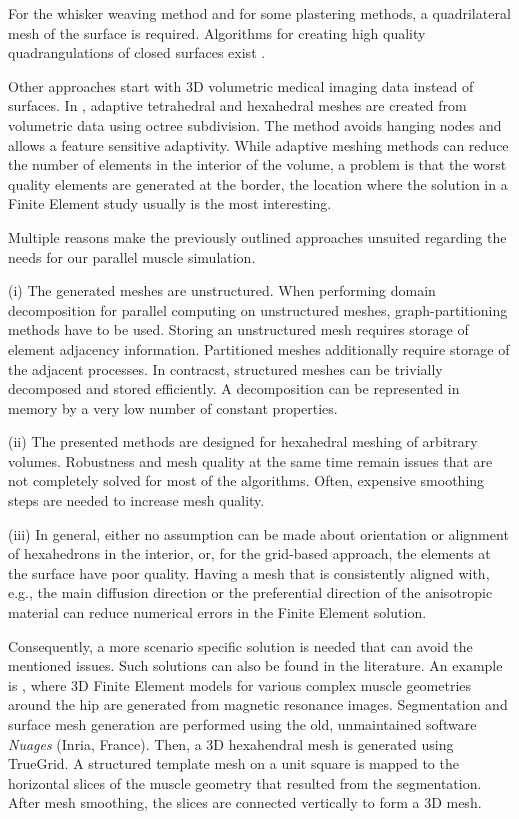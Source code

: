 For the whisker weaving method and for some plastering methods, a quadrilateral mesh of the surface is required. Algorithms for creating high quality quadrangulations of closed surfaces exist \cite{dong2005quadrangulating,Kovacs2011Anisotropic,Bessmeltsev2012,Meng2016Consistent}.

Other approaches start with 3D volumetric medical imaging data instead of surfaces. In \cite{Zhang2003,Zhang20053DFiniteElementMeshing}, adaptive tetrahedral and hexahedral meshes are created from volumetric data using octree subdivision. The method avoids hanging nodes and allows a feature sensitive adaptivity. While adaptive meshing methods can reduce the number of elements in the interior of the volume, a problem is that the worst quality elements are generated at the border, the location where the solution in a Finite Element study usually is the most interesting.

Multiple reasons make the previously outlined approaches unsuited regarding the needs for our parallel muscle simulation. 

(i) The generated meshes are unstructured. When performing domain decomposition for parallel computing on unstructured meshes, graph-partitioning methods have to be used. Storing an unstructured mesh requires storage of element adjacency information. Partitioned meshes additionally require storage of the adjacent processes. In contracst, structured meshes can be trivially decomposed and stored efficiently. A decomposition can be represented in memory by a very low number of constant properties.

(ii) The presented methods are designed for hexahedral meshing of arbitrary volumes. Robustness and mesh quality at the same time remain issues that are not completely solved for most of the algorithms. Often, expensive smoothing steps are needed to increase mesh quality.

(iii) In general, either no assumption can be made about orientation or alignment of hexahedrons in the interior, or, for the grid-based approach, the elements at the surface have poor quality. Having a mesh that is consistently aligned with, e.g., the main diffusion direction or the preferential direction of the anisotropic material can reduce numerical errors in the Finite Element solution.

Consequently, a more scenario specific solution is needed that can avoid the mentioned issues. Such solutions can also be found in the literature. An example is \cite{blemker2005three}, where 3D Finite Element models for various complex muscle geometries  around the hip are generated from magnetic resonance images. Segmentation and surface mesh generation are performed using the old, unmaintained software \emph{Nuages} (Inria, France).
Then, a 3D hexahendral mesh is generated using TrueGrid. A structured template mesh on a unit square is mapped to the horizontal slices of the muscle geometry that resulted from the segmentation. After mesh smoothing, the slices are connected vertically to form a 3D mesh. 

